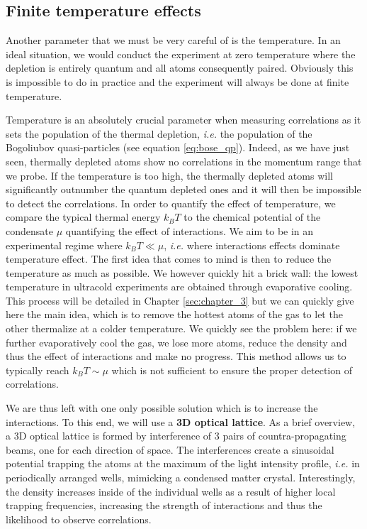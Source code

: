\subsection{Finite temperature effects}

Another parameter that we must be very careful of is the temperature. In an ideal situation, we would conduct the experiment at zero temperature where the depletion is entirely quantum and all atoms consequently \kmk paired. Obviously this is impossible to do in practice and the experiment will always be done at finite temperature.

Temperature is an absolutely crucial parameter when measuring \kmk correlations as it sets the population of the thermal depletion, {\it i.e.} the population of the Bogoliubov quasi-particles (see equation \ref{eq:bose_qp}). Indeed, as we have just seen, thermally depleted atoms show no \kmk correlations in the momentum range that we probe. If the temperature is too high, the thermally depleted atoms will significantly outnumber the quantum depleted ones and it will then be impossible to detect the \kmk correlations. In order to quantify the effect of temperature, we compare the typical thermal energy $k_B T$ to the chemical potential of the condensate $\mu$ quantifying the effect of interactions. We aim to be in an experimental regime where $k_B T \ll \mu$, {\it i.e.} where interactions effects dominate temperature effect. The first idea that comes to mind is then to reduce the temperature as much as possible. We however quickly hit a brick wall: the lowest temperature in ultracold experiments are obtained through evaporative cooling. This process will be detailed in Chapter \ref{sec:chapter_3} but we can quickly give here the main idea, which is to remove the hottest atoms of the gas to let the other thermalize at a colder temperature. We quickly see the problem here: if we further evaporatively cool the gas, we lose more atoms, reduce the density and thus the effect of interactions and make no progress. This method allows us to typically reach $k_B T \sim \mu$ which is not sufficient to ensure the proper detection of \kmk correlations.

We are thus left with one only possible solution which is to increase the interactions. To this end, we will use a \textbf{3D optical lattice}. As a brief overview, a 3D optical lattice is formed by interference of 3 pairs of countra-propagating beams, one for each direction of space. The interferences create a sinusoidal potential trapping the atoms at the maximum of the light intensity profile, {\it i.e.} in periodically arranged wells, mimicking a condensed matter crystal. Interestingly, the density increases inside of the individual wells as a result of higher local trapping frequencies, increasing the strength of interactions and thus the likelihood to observe \kmk correlations.

